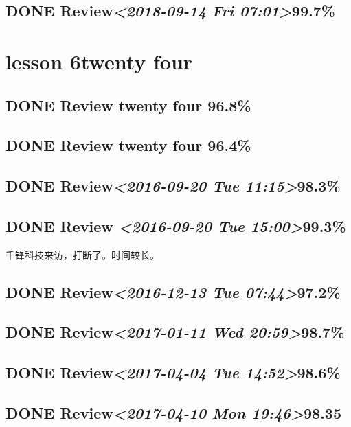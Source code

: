 \documentclass[11pt]{ctexart}
\begin{document}
\subsection{{\bfseries\sffamily DONE} Review\textit{<2018-09-14 Fri 07:01>}99.7\%}
\label{sec:org09d1dde}
\section{lesson 6twenty four}
\label{sec:orge3bfac3}
\subsection{{\bfseries\sffamily DONE} Review twenty four 96.8\%}
\label{sec:org2db2f7f}
\subsection{{\bfseries\sffamily DONE} Review twenty four 96.4\%}
\label{sec:orgfdf7eae}

\subsection{{\bfseries\sffamily DONE} Review\textit{<2016-09-20 Tue 11:15>}98.3\%}
\label{sec:org62d605a}
\subsection{{\bfseries\sffamily DONE} Review \textit{<2016-09-20 Tue 15:00>}99.3\%}
\label{sec:org1fc2b43}
千锋科技来访，打断了。时间较长。
\subsection{{\bfseries\sffamily DONE} Review\textit{<2016-12-13 Tue 07:44>}97.2\%}
\label{sec:orgf3bfc63}
\subsection{{\bfseries\sffamily DONE} Review\textit{<2017-01-11 Wed 20:59>}98.7\%}
\label{sec:org814b781}
\subsection{{\bfseries\sffamily DONE} Review\textit{<2017-04-04 Tue 14:52>}98.6\%}
\label{sec:org0d60ba1}
\subsection{{\bfseries\sffamily DONE} Review\textit{<2017-04-10 Mon 19:46>}98.35}
\label{sec:orgfa30d04}
\end{document}
